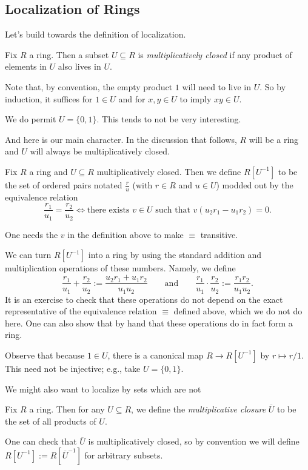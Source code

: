 \subsection{Localization of Rings}
Let's build towards the definition of localization.
\begin{definition}
	Fix $R$ a ring. Then a subset $U\subseteq R$ is \textit{multiplicatively closed} if any product of elements in $U$ also lives in $U$.
\end{definition}
Note that, by convention, the empty product $1$ will need to live in $U$. So by induction, it suffices for $1\in U$ and for $x,y\in U$ to imply $xy\in U$.
\begin{remark}
	We do permit $U=\{0,1\}$. This tends to not be very interesting.
\end{remark}
And here is our main character. In the discussion that follows, $R$ will be a ring and $U$ will always be multiplicatively closed.
\begin{definition}
	Fix $R$ a ring and $U\subseteq R$ multiplicatively closed. Then we define $R\left[U^{-1}\right]$ to be the set of ordered pairs notated $\frac ru$ (with $r\in R$ and $u\in U$) modded out by the equivalence relation
	\[\frac{r_1}{u_1}=\frac{r_2}{u_2}\iff\text{there exists }v\in U\text{ such that }v(u_2r_1-u_1r_2)=0.\]
\end{definition}
\begin{remark}
	One needs the $v$ in the definition above to make $\equiv$ transitive.
\end{remark}
We can turn $R\left[U^{-1}\right]$ into a ring by using the standard addition and multiplication operations of these numbers. Namely, we define
\[\frac{r_1}{u_1}+\frac{r_2}{u_2}:=\frac{u_2r_1+u_1r_2}{u_1u_2}\qquad\text{and}\qquad\frac{r_1}{u_1}\cdot\frac{r_2}{u_2}:=\frac{r_1r_2}{u_1u_2}.\]
It is an exercise to check that these operations do not depend on the exact representative of the equivalence relation $\equiv$ defined above, which we do not do here. One can also show that by hand that these operations do in fact form a ring.
\begin{remark}
	Observe that because $1\in U$, there is a canonical map $R\to R\left[U^{-1}\right]$ by $r\mapsto r/1$. This need not be injective; e.g., take $U=\{0,1\}.$
\end{remark}

We might also want to localize by sets which are not 
\begin{definition}
	Fix $R$ a ring. Then for any $U\subseteq R$, we define the \textit{multiplicative closure} $\overline U$ to be the set of all products of $U$.
\end{definition}
One can check that $\overline U$ is multiplicatively closed, so by convention we will define $R\left[U^{-1}\right]:=R\left[\overline U^{-1}\right]$ for arbitrary subsets.

